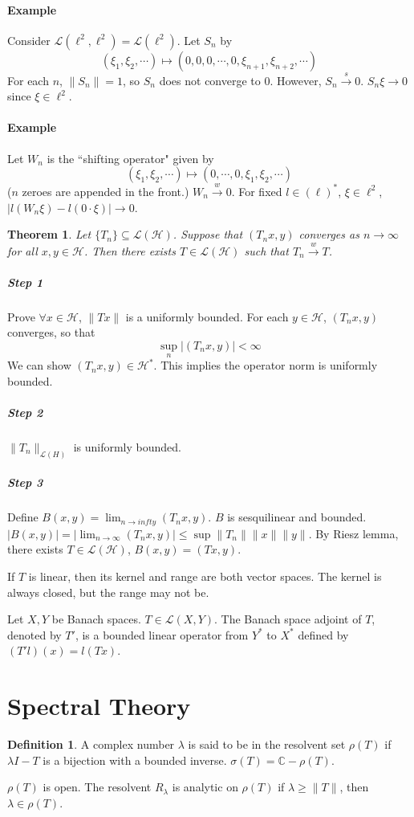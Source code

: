 \documentclass[12pt]{article}
\theoremstyle{plain}
\newtheorem{theorem}[equation]{Theorem}
\theoremstyle{definition}
\newtheorem{definition}[equation]{Definition}
\theoremstyle{named}
\newcommand{\shH}{\mathscr{H}}
\newcommand{\shL}{\mathscr{L}}
\newcommand{\<}{\langle}
\renewcommand{\>}{\rangle}
\newcommand{\IC}{\mathbb{C}}
\begin{document}
\paragraph{Example} Consider $\shL(\ell^2, \ell^2) = \shL(\ell^2)$. Let $S_n$ by $$( \xi_1, \xi_2, \cdots) \mapsto (0, 0, 0, \cdots, 0, \xi_{n + 1}, \xi_{n + 2}, \cdots)$$ For each $n$, $\| S_n \| = 1$, so $S_n$ does not converge to $0$. However, $S_n \stackrel{s}{\to} 0$. $S_n \xi \to 0$ since $\xi \in \ell^2$. 

\paragraph{Example} Let $W_n$ is the ``shifting operator" given by $$(\xi_1, \xi_2, \cdots ) \mapsto (0, \cdots, 0, \xi_1, \xi_2, \cdots) $$ ($n$ zeroes are appended in the front.) $W_n \stackrel{w}{\to} 0$. For fixed $l \in (\ell)^*$, $\xi \in \ell^2$, $|l(W_n \xi) - l(0 \cdot \xi)| \to 0$. 

\begin{theorem}
Let $\{ T_n \} \subseteq \shL(\shH)$. Suppose that $(T_n x, y)$ converges as $n \to \infty$ for all $x, y \in \shH$. Then there exists $T \in \shL(\shH)$ such that $T_n \stackrel{w}{\to} T$. 
\end{theorem}


\subparagraph{Step 1} Prove $\forall x \in \shH$, $\| Tx \|$ is a uniformly bounded. For each $y \in \shH$, $(T_n x, y)$ converges, so that $$\sup_{n} |(T_n x, y)| < \infty$$ We can show $(T_n x, y) \in \shH^*$. This implies the operator norm is uniformly bounded. 

\subparagraph{Step 2} $ \| T_n \|_{\shL(H)}$ is uniformly bounded. 

\subparagraph{Step 3} Define $B(x, y) = \lim_{n \to infty} (T_n x, y) $. $B$ is sesquilinear and bounded. $|B(x, y)| = |\lim_{n \to \infty} (T_n x, y)| \le \sup  \| T_n \| \| x \| \| y \|$. By Riesz lemma, there exists $T \in \shL(\shH)$, $B(x, y) = (Tx, y)$.  


If $T$ is linear, then its kernel and range are both vector spaces. The kernel is always closed, but the range may not be. 

Let $X, Y$ be Banach spaces. $T \in \shL(X, Y)$. The Banach space adjoint of $T$, denoted by $T'$, is a bounded linear operator from $Y^*$ to $X^*$ defined by 
$(T'l)(x) = l(Tx)$. 

\section{Spectral Theory}
\begin{definition}
A complex number $\lambda$ is said to be in the resolvent set $\rho(T)$ if $\lambda I - T$ is a bijection with a bounded inverse. $\sigma(T) = \IC - \rho(T)$. 
\end{definition}
$\rho(T)$ is open. The resolvent $R_\lambda$ is analytic on $\rho(T)$ if $\lambda \ge \| T \|$, then $\lambda \in \rho(T)$. 
\end{document}
